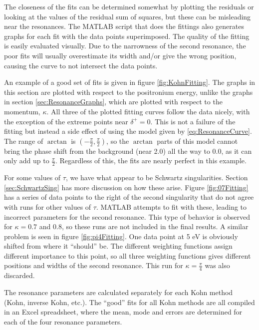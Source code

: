 \documentclass[Dissertation.tex]{subfiles}
\begin{document}
The closeness of the fits can be determined somewhat by plotting the residuals or looking at the values of the residual sum of squares, but these can be misleading near the resonances.  The MATLAB script that does the fittings also generates graphs for each fit with the data points superimposed.  The quality of the fitting is easily evaluated visually.  Due to the narrowness of the second resonance, the poor fits will usually overestimate its width and/or give the wrong position, causing the curve to not intersect the data points.

An example of a good set of fits is given in figure \ref{fig:KohnFitting}.  The graphs in this section are plotted with respect to the positronium energy, unlike the graphs in section \ref{sec:ResonanceGraphs}, which are plotted with respect to the momentum, $\kappa$.  All three of the plotted fitting curves follow the data nicely, with the exception of the extreme points near $\delta^+ = 0$.  This is not a failure of the fitting but instead a side effect of using the model given by \ref{eq:ResonanceCurve}.  The range of $\arctan$ is $(-\frac{\pi}{2},\frac{\pi}{2})$, so the $\arctan$ parts of this model cannot bring the phase shift from the background (near 2.0) all the way to 0.0, as it can only add up to $\frac{\pi}{2}$.  Regardless of this, the fits are nearly perfect in this example.

For some values of $\tau$, we have what appear to be Schwartz singularities.  Section \ref{sec:SchwartzSing} has more discussion on how these arise.  Figure \ref{fig:07Fitting} has a series of data points to the right of the second singularity that do not agree with runs for other values of $\tau$.  MATLAB attempts to fit with these, leading to incorrect parameters for the second resonance.  This type of behavior is observed for $\kappa = 0.7$ and $0.8$, so these runs are not included in the final results.  A similar problem is seen in figure \ref{fig:pi4Fitting}.  One data point at 5 eV is obviously shifted from where it ``should'' be.  The different weighting functions assign different importance to this point, so all three weighting functions gives different positions and widths of the second resonance.  This run for $\kappa = \frac{\pi}{4}$ was also discarded. 

The resonance parameters are calculated separately for each Kohn method (Kohn, inverse Kohn, etc.).  The ``good'' fits for all Kohn methods are all compiled in an Excel spreadsheet, where the mean, mode and errors are determined for each of the four resonance parameters.
\end{document}
